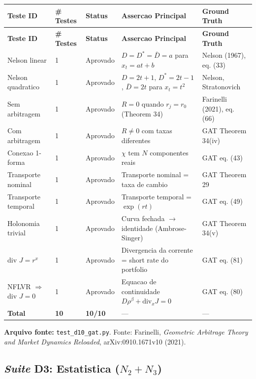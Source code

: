 \begin{longtable}{|p{2.5cm}|p{2.0cm}|p{2.0cm}|p{3.5cm}|p{3.5cm}|}
\hline
\textbf{Teste ID} & \textbf{\# Testes} & \textbf{Status} & \textbf{Assercao Principal} & \textbf{Ground Truth} \\
\hline
\endfirsthead
\hline
\textbf{Teste ID} & \textbf{\# Testes} & \textbf{Status} & \textbf{Assercao Principal} & \textbf{Ground Truth} \\
\hline
\endhead
\hline
\endfoot
Nelson linear & 1 & Aprovado & $D=D^{*}=\bar{D}=a$ para $x_{t}=at+b$ & Nelson (1967), eq. (33) \\
\hline
Nelson quadratico & 1 & Aprovado & $D=2t+1$, $D^{*}=2t-1$, $\bar{D}=2t$ para $x_{t}=t^{2}$ & Nelson, Stratonovich \\
\hline
Sem arbitragem & 1 & Aprovado & $R=0$ quando $r_{j}=r_{0}$ (Theorem 34) & Farinelli (2021), eq. (66) \\
\hline
Com arbitragem & 1 & Aprovado & $R\neq 0$ com taxas diferentes & GAT Theorem 34(iv) \\
\hline
Conexao 1-forma & 1 & Aprovado & $\chi$ tem $N$ componentes reais & GAT eq. (43) \\
\hline
Transporte nominal & 1 & Aprovado & Transporte nominal = taxa de cambio & GAT Theorem 29 \\
\hline
Transporte temporal & 1 & Aprovado & Transporte temporal = $\exp(rt)$ & GAT eq. (49) \\
\hline
Holonomia trivial & 1 & Aprovado & Curva fechada $\rightarrow$ identidade (Ambrose-Singer) & GAT Theorem 34(v) \\
\hline
div $J = r^{x}$ & 1 & Aprovado & Divergencia da corrente = short rate do portfolio & GAT eq. (81) \\
\hline
NFLVR $\Rightarrow$ div $J=0$ & 1 & Aprovado & Equacao de continuidade $D\rho^{\beta}+\text{div}_{x}J=0$ & GAT eq. (80) \\
\hline
\textbf{Total} & \textbf{10} & \textbf{10/10} & --- & --- \\
\hline
\end{longtable}

\textbf{Arquivo fonte:} \texttt{test\_d10\_gat.py}. Fonte: Farinelli, \textit{Geometric Arbitrage Theory and Market Dynamics Reloaded}, arXiv:0910.1671v10 (2021).

\subsection{\textit{Suite} D3: Estatistica ($N_2+N_3$)}

